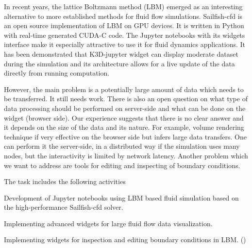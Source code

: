 \begin{task}[
  title=Application: Reproducible research based on GPU,
  id=application-gpu,
  lead=SIL,
  PM=12,
  wphases={0-48},
  partners={}
]
In recent years, the lattice Boltzmann method (LBM) emerged as an interesting alternative to more established methods for fluid flow simulations. Sailfish-cfd \cite{januszewski2014sailfish} is an open source implementation of LBM on GPU devices. It is written in Python with real-time generated CUDA-C code. The Jupyter notebooks with its widgets interface make it especially attractive to use it for fluid dynamics applications. It has been demonstrated that K3D-jupyter widget can display moderate dataset during the simulation and its architecture allows for a live update of the data directly from running computation.   

However, the main problem is a potentially large amount of data which needs to be transferred. It still needs work. There is also an open question on what type of data processing should be performed on server-side and what can be done on the widget (browser side). Our experience suggests that there is no clear answer and it depends on the size of the data and its nature. For example, volume rendering technique if very effective on the browser side but infers large data transfers. One can perform it the server-side, in a distributed way if the simulation uses many nodes, but the interactivity is limited by network latency. Another problem which we want to address are tools for editing and inspecting of boundary conditions. 

  The task includes the following activities
  \begin{compactitem}
  \item Development of Jupyter notebooks using LBM based fluid simulation based on the high-performance Sailfish-cfd solver.
  \item Implementing advanced widgets for large fluid flow data visualization. 
  \item Implementing widgets for inspection and editing boundary conditions in LBM.
    ()
  \end{compactitem}
  



  
\end{task}
